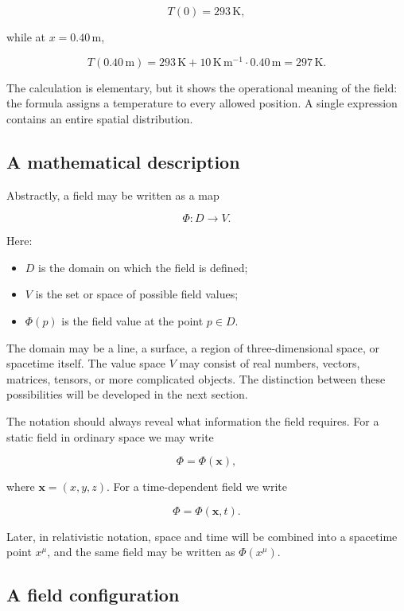 \[
T(0)=293\,\mathrm{K},
\]

while at \(x=0.40\,\mathrm{m}\),

\[
T(0.40\,\mathrm{m})
=
293\,\mathrm{K}
+
10\,\mathrm{K\,m^{-1}}\cdot 0.40\,\mathrm{m}
=
297\,\mathrm{K}.
\]

The calculation is elementary, but it shows the operational meaning of the field: the formula assigns a temperature to every allowed position. A single expression contains an entire spatial distribution.

\subsection{A mathematical description}

Abstractly, a field may be written as a map

\[
\Phi : D \longrightarrow V.
\]

Here:

\begin{itemize}
    \item \(D\) is the domain on which the field is defined;
    \item \(V\) is the set or space of possible field values;
    \item \(\Phi(p)\) is the field value at the point \(p\in D\).
\end{itemize}

The domain may be a line, a surface, a region of three-dimensional space, or spacetime itself. The value space \(V\) may consist of real numbers, vectors, matrices, tensors, or more complicated objects. The distinction between these possibilities will be developed in the next section.

The notation should always reveal what information the field requires. For a static field in ordinary space we may write

\[
\Phi=\Phi(\mathbf{x}),
\]

where \(\mathbf{x}=(x,y,z)\). For a time-dependent field we write

\[
\Phi=\Phi(\mathbf{x},t).
\]

Later, in relativistic notation, space and time will be combined into a spacetime point \(x^{\mu}\), and the same field may be written as \(\Phi(x^{\mu})\).

\subsection{A field configuration}

